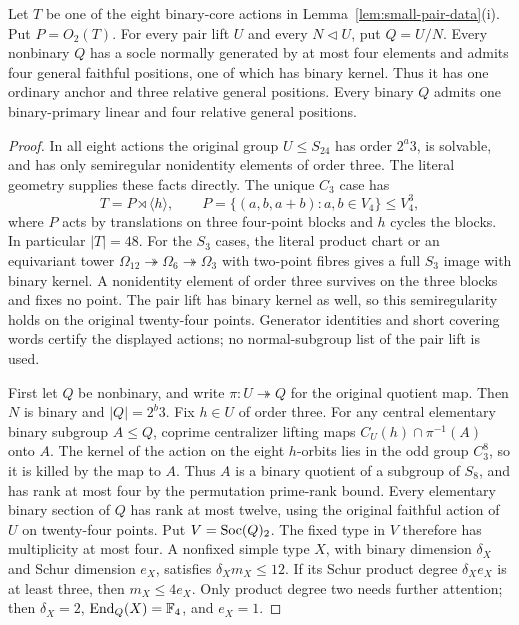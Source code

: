 \begin{samepage}
\begin{lemma}\label{lem:twelve-core}
Let $T$ be one of the eight binary-core actions in
Lemma~\ref{lem:small-pair-data}(i). Put $P=O_2(T)$.
For every pair lift $U$ and every $N\lhd U$, put $Q=U/N$.
Every nonbinary $Q$ has a socle normally generated by at most four
elements and admits four general faithful positions, one of which has
binary kernel. Thus it has one ordinary anchor and three relative
general positions. Every binary $Q$ admits one binary-primary linear
and four relative general positions.
\end{lemma}
\end{samepage}
\begin{proof}
In all eight actions the original group $U\leq S_{24}$ has order
$2^a3$, is solvable, and has only semiregular nonidentity elements
of order three. The literal geometry supplies these facts directly.
The unique $C_3$ case has
\[
 T=P\rtimes\langle h\rangle,\qquad
 P=\{(a,b,a+b):a,b\in V_4\}\leq V_4^3,
\]
where $P$ acts by translations on three four-point blocks and $h$
cycles the blocks. In particular $|T|=48$. For the $S_3$ cases,
the literal product chart or an equivariant tower
$\Omega_{12}\twoheadrightarrow\Omega_6\twoheadrightarrow\Omega_3$
with two-point fibres gives a full $S_3$ image with binary kernel.
A nonidentity element of order three survives on the three blocks
and fixes no point. The pair lift has binary kernel as well, so this
semiregularity holds on the original twenty-four points. Generator
identities and short covering words certify the displayed actions;
no normal-subgroup list of the pair lift is used.

First let $Q$ be nonbinary, and write $\pi:U\twoheadrightarrow Q$
for the original quotient map. Then $N$ is binary and $|Q|=2^b3$.
Fix $h\in U$ of order three. For any central
elementary binary subgroup $A\leq Q$, coprime centralizer lifting maps
$C_U(h)\cap\pi^{-1}(A)$ onto $A$. The kernel of the action on the
eight $h$-orbits lies in the odd group $C_3^8$, so it is killed by
the map to $A$. Thus $A$ is a binary quotient of a subgroup of $S_8$,
and has rank at most four by the permutation prime-rank bound.
Every elementary binary section of $Q$ has rank at most twelve,
using the original faithful action of $U$ on twenty-four points.
Put $V=\operatorname{Soc}(Q)_2$. The fixed type in $V$ therefore has multiplicity
at most four. A nonfixed simple type $X$, with binary dimension
$\delta_X$ and Schur dimension $e_X$, satisfies $\delta_Xm_X\leq12$.
If its Schur product degree $\delta_Xe_X$ is at least three, then
$m_X\leq4e_X$. Only product degree two needs further attention;
then $\delta_X=2$, $\operatorname{End}_Q(X)=\mathbb F_4$, and $e_X=1$.


\end{proof}
